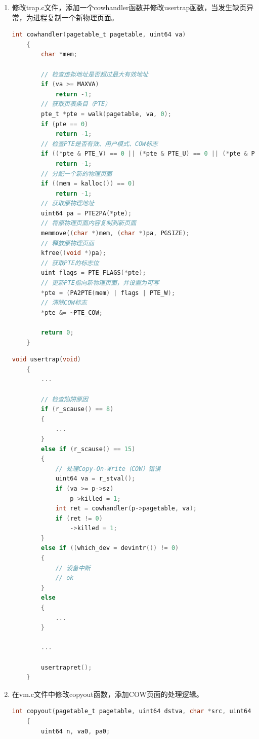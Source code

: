 \begin{enumerate}
\begin{lstlisting}[language=c,title=对kfree函数的修改]
        r = (struct run *)pa;

        acquire(&kmem.lock);
        r->next = kmem.freelist;
        kmem.freelist = r;
        release(&kmem.lock);
    } 
    \end{lstlisting}
    \item 修改trap.c文件，添加一个cowhandler函数并修改usertrap函数，当发生缺页异常，为进程复制一个新物理页面。
          \begin{lstlisting}[language=c,title=cowhandler函数的实现]
    int cowhandler(pagetable_t pagetable, uint64 va)
    {
        char *mem;
    
        // 检查虚拟地址是否超过最大有效地址
        if (va >= MAXVA)
            return -1;
        // 获取页表条目（PTE）
        pte_t *pte = walk(pagetable, va, 0);
        if (pte == 0)
            return -1;   
        // 检查PTE是否有效、用户模式、COW标志
        if ((*pte & PTE_V) == 0 || (*pte & PTE_U) == 0 || (*pte & PTE_COW) == 0)
            return -1;
        // 分配一个新的物理页面
        if ((mem = kalloc()) == 0)
            return -1; 
        // 获取原物理地址
        uint64 pa = PTE2PA(*pte);
        // 将原物理页面内容复制到新页面
        memmove((char *)mem, (char *)pa, PGSIZE);
        // 释放原物理页面
        kfree((void *)pa);
        // 获取PTE的标志位
        uint flags = PTE_FLAGS(*pte);
        // 更新PTE指向新物理页面，并设置为可写
        *pte = (PA2PTE(mem) | flags | PTE_W);
        // 清除COW标志
        *pte &= ~PTE_COW;
    
        return 0;
    }            
    \end{lstlisting}
          \begin{lstlisting}[language=c,title=对usertrap函数的修改]
    void usertrap(void)
    {
        ...

        // 检查陷阱原因
        if (r_scause() == 8)
        {
            ...
        }
        else if (r_scause() == 15)
        {
            // 处理Copy-On-Write（COW）错误
            uint64 va = r_stval();
            if (va >= p->sz)
                p->killed = 1;
            int ret = cowhandler(p->pagetable, va);
            if (ret != 0)
                ->killed = 1;
        }
        else if ((which_dev = devintr()) != 0)
        {
            // 设备中断
            // ok
        }
        else
        {
            ...
        }

        ...
        
        usertrapret();
    }
    \end{lstlisting}
    \item 在vm.c文件中修改copyout函数，添加COW页面的处理逻辑。
          \begin{lstlisting}[language=c,title=对copyout函数的修改]
    int copyout(pagetable_t pagetable, uint64 dstva, char *src, uint64 len)
    {
        uint64 n, va0, pa0;


\end{lstlisting}
\end{enumerate}
